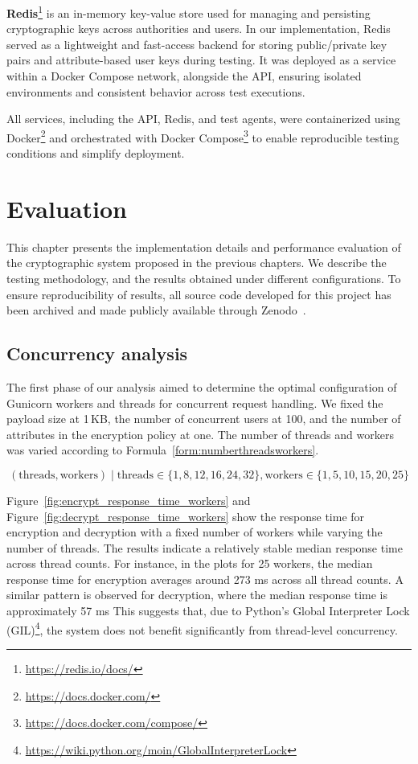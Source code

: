 \documentclass[cic,tc,english]{iiufrgs}
\numberwithin{algorithm}{chapter}
\begin{document}
            \textbf{Redis}\footnote{\url{https://redis.io/docs/}} is an in-memory key-value store used for managing and persisting cryptographic keys across authorities and users. In our implementation, Redis served as a lightweight and fast-access backend for storing public/private key pairs and attribute-based user keys during testing. It was deployed as a service within a Docker Compose network, alongside the API, ensuring isolated environments and consistent behavior across test executions.

            All services, including the API, Redis, and test agents, were containerized using Docker\footnote{\url{https://docs.docker.com/}} and orchestrated with Docker Compose\footnote{\url{https://docs.docker.com/compose/}} to enable reproducible testing conditions and simplify deployment.

\chapter{Evaluation}
    \label{chap:evaluation}
    This chapter presents the implementation details and performance evaluation of the cryptographic system proposed in the previous chapters. We describe the testing methodology, and the results obtained under different configurations. To ensure reproducibility of results, all source code developed for this project has been archived and made publicly available through Zenodo~\citep{maabeflask}.

        \section{Concurrency analysis}
        \label{subsec:phase1_concurrency}

        The first phase of our analysis aimed to determine the optimal configuration of Gunicorn workers and threads for concurrent request handling. We fixed the payload size at 1\,KB, the number of concurrent users at 100, and the number of attributes in the encryption policy at one. The number of threads and workers was varied according to Formula~\ref{form:numberthreadsworkers}.

        \begin{equation}
            \label{form:numberthreadsworkers}
            (\text{threads}, \text{workers}) \mid \text{threads} \in \{1, 8, 12, 16, 24, 32\}, \text{workers} \in \{1, 5, 10, 15, 20, 25\} 
        \end{equation}

        Figure~\ref{fig:encrypt_response_time_workers} and Figure~\ref{fig:decrypt_response_time_workers} show the response time for encryption and decryption with a fixed number of workers while varying the number of threads. The results indicate a relatively stable median response time across thread counts. For instance, in the plots for 25 workers, the median response time for encryption averages around 273 ms across all thread counts. A similar pattern is observed for decryption, where the median response time is approximately 57 ms This suggests that, due to Python's Global Interpreter Lock (GIL)\footnote{\url{https://wiki.python.org/moin/GlobalInterpreterLock}}, the system does not benefit significantly from thread-level concurrency.
\end{document}

